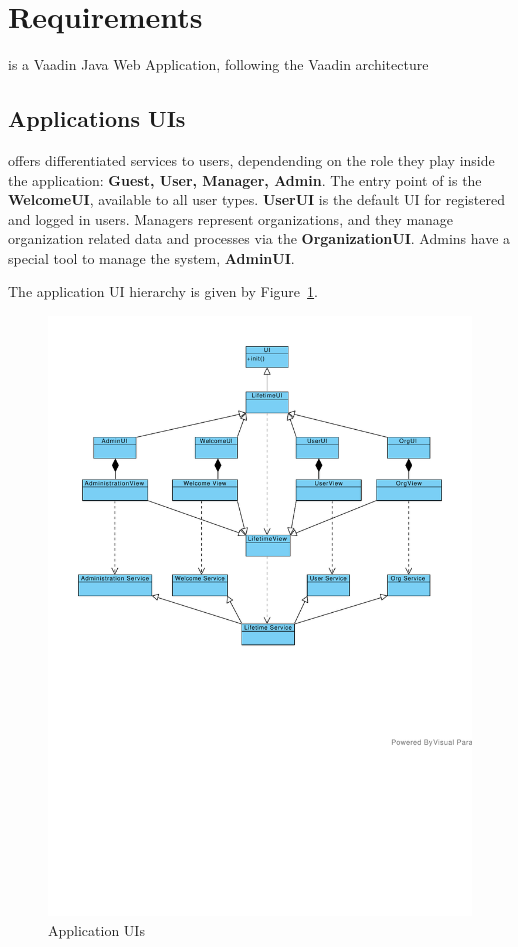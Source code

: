 
\section{Requirements}
\label{sec:requirements}


\vitae is a Vaadin Java Web Application, following the Vaadin
architecture 

\subsection{Applications UIs}
\label{sec:applications-uis}

\vitae offers differentiated services to users, dependending on the
role they play inside the application: \textbf{Guest, User, Manager,
  Admin}. The entry point of \vitae is the \textbf{WelcomeUI},
available to all user types. \textbf{UserUI} is the default UI for
registered and logged in users. Managers represent organizations, and
they manage organization related data and processes via the
\textbf{OrganizationUI}. Admins have a special tool to manage the
system, \textbf{AdminUI}.
%

%
The application UI hierarchy is given by Figure~\ref{fig:uis}.
\begin{figure}[htpb]
  \centering
  \includegraphics[scale=.75]{figures/uis}
  \caption{\vitae Application UIs}
  \label{fig:uis}
\end{figure}


